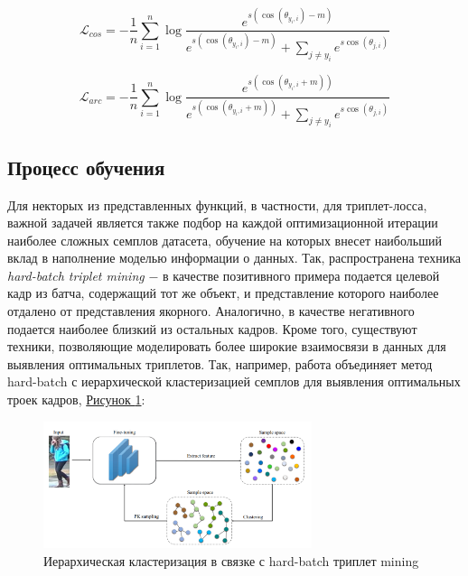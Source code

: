  \begin{equation}
     \mathcal L_{cos} = - \frac{1}{n} \sum \limits_{i = 1}^{n} \log \frac{e^{s \left(  \cos (\theta_{y_i, i}) - m \right)}}{e^{s \left(  \cos (\theta_{y_i, i}) - m \right)} + \sum_{j \neq y_i} e^{s \cos (\theta_{j, i})}}
 \end{equation}

 \begin{equation}
     \mathcal L_{arc} = - \frac{1}{n} \sum \limits_{i = 1}^{n} \log \frac{e^{s \left(  \cos (\theta_{y_i, i} + m) \right)}}{e^{s \left(  \cos (\theta_{y_i, i} + m) \right)} + \sum_{j \neq y_i} e^{s \cos (\theta_{j, i})}}
 \end{equation}

 \subsection{Процесс обучения}

 Для некторых из представленных функций, в частности, для триплет-лосса, важной задачей является также подбор на каждой оптимизационной итерации наиболее сложных семплов датасета, обучение на которых внесет наибольший вклад в наполнение моделью информации о данных. Так, распространена техника \textit{hard-batch triplet mining} $-$ в качестве позитивного примера подается целевой кадр из батча, содержащий тот же объект, и представление которого наиболее отдалено от представления якорного. Аналогично, в качестве негативного подается наиболее близкий из остальных кадров. Кроме того, существуют техники, позволяющие моделировать более широкие взаимосвязи в данных для выявления оптимальных триплетов. Так, например, работа \cite{zeng2020hierarchical} объединяет метод hard-batch с иерархической кластеризацией семплов для выявления оптимальных троек кадров, \hyperref[fig:clusters]{Рисунок \ref*{fig:clusters}}:

 \begin{figure}[ht]
     \centering
     \includegraphics[width=0.7\textwidth]{images/closed_world/clusters.png}
     \caption{Иерархическая кластеризация в связке с hard-batch триплет mining \cite{zeng2020hierarchical}}
     \label{fig:clusters}
 \end{figure}


